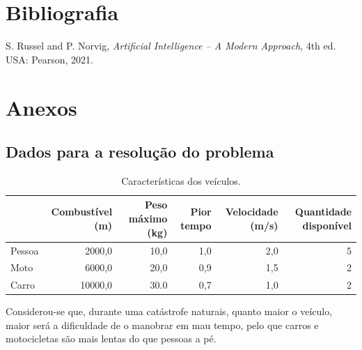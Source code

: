 \documentclass[12pt, a4paper, titlepage]{article}
\begin{document}
\section{Bibliografia}
\def\refname{}
\vspace{-1.5cm}
\begin{thebibliography}{9}
     S. Russel and P. Norvig, \emph{Artificial Intelligence -- A Modern Approach},
        4th ed. USA: Pearson, 2021.
\end{thebibliography}

\section{Anexos}

\subsection{Dados para a resolução do problema}
\label{problem-data}

\begin{table}[H]
    \small

    \begin{adjustwidth}{-1.5cm}{-1.5cm}
        \begin{center}
            \begin{tabular}{|l|r|r|r|r|r|}
                \hline
                                                &
                    Combustível (m)             &
                    Peso máximo (kg)            &
                    Pior tempo &
                    Velocidade (m/s)            &
                    Quantidade disponível \\

                \hline
                Pessoa & 2000,0  & 10,0 & 1,0 & 2,0 & 5 \\
                \hline
                Moto   & 6000,0  & 20,0 & 0,9 & 1,5 & 2 \\
                \hline
                Carro  & 10000,0 & 30.0 & 0,7 & 1,0 & 2 \\
                \hline
            \end{tabular}
        \end{center}
    \end{adjustwidth}

    \caption{Características dos veículos.}
\end{table}

Considerou-se que, durante uma catástrofe naturais, quanto maior o veículo, maior será a dificuldade
de o manobrar em mau tempo, pelo que carros e motocicletas são mais lentas do que pessoas a pé.
\end{document}
